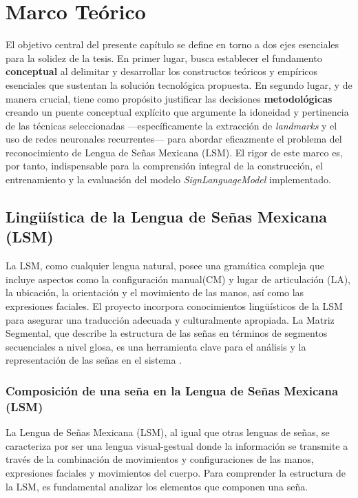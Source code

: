 \chapter{Marco Teórico}

El objetivo central del presente capítulo se define en torno a dos ejes esenciales para la solidez de la tesis. En primer lugar, busca establecer el fundamento \textbf{conceptual} al delimitar y desarrollar los constructos teóricos y empíricos esenciales que sustentan la solución tecnológica propuesta. En segundo lugar, y de manera crucial, tiene como propósito justificar las decisiones \textbf{metodológicas}  creando un puente conceptual explícito que argumente la idoneidad y pertinencia de las técnicas seleccionadas —específicamente la extracción de \textit{landmarks} y el uso de redes neuronales recurrentes— para abordar eficazmente el problema del reconocimiento de Lengua de Señas Mexicana (LSM). El rigor de este marco es, por tanto, indispensable para la comprensión integral de la construcción, el entrenamiento y la evaluación del modelo \textit{SignLanguageModel} implementado.


\section{Lingüística de la Lengua de Señas Mexicana (LSM)}
La LSM, como cualquier lengua natural, posee una gramática compleja que incluye aspectos como la configuración manual(CM) y lugar de articulación (LA), la ubicación, la orientación y el movimiento de las manos, así como las expresiones faciales. El proyecto incorpora conocimientos lingüísticos de la LSM para asegurar una traducción adecuada y culturalmente apropiada. La Matriz Segmental, que describe la estructura de las señas en términos de segmentos secuenciales a nivel glosa, es una herramienta clave para el análisis y la representación de las señas en el sistema \cite{ref36}.

\subsection{Composición de una seña en la Lengua de Señas Mexicana (LSM)}

La Lengua de Señas Mexicana (LSM), al igual que otras lenguas de señas, se caracteriza por ser una lengua visual-gestual donde la información se transmite a través de la combinación de movimientos y configuraciones de las manos, expresiones faciales y movimientos del cuerpo. Para comprender la estructura de la LSM, es fundamental analizar los elementos que componen una seña.  \cite{ref42}

